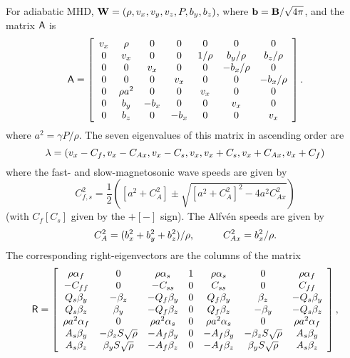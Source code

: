 For adiabatic MHD, ${\bf W} = (\rho, v_{x}, v_{y}, v_{z}, P, b_{y}, b_{z})$,
where ${\bf b} = {\bf B}/\sqrt{4\pi}$, and the matrix ${\sf A}$ is
\begin{equation}
{\sf A} = \left[ \begin{array}{cccccccc}
v_x & \rho & 0 & 0 & 0 & 0 & 0 \\
0 & v_x & 0 & 0 & 1/\rho & b_y/\rho & b_z/\rho \\
0 & 0 & v_x & 0 & 0 & -b_x/\rho & 0 \\
0 & 0 & 0 & v_x & 0 & 0 & -b_x/\rho \\
0 & \rho a^{2} & 0 & 0 & v_{x} & 0 & 0 \\
0 & b_y & -b_x & 0 & 0 & v_x & 0 \\
0 & b_z & 0 & -b_x & 0 & 0 & v_x  \end{array} \right] .
\end{equation}
where $a^{2} = \gamma P/\rho$.
The seven eigenvalues of this matrix in ascending order are
\begin{equation}
{\bf \lambda} = (v_{x}-C_{f}, v_{x}-C_{Ax}, v_{x}-C_{s}, v_{x},
v_{x}+C_{s}, v_{x}+C_{Ax}, v_{x}+C_{f})
\end{equation}
where the fast- and slow-magnetosonic wave speeds are given by
\begin{equation}
C_{f,s}^2 = \frac{1}{2} \left( \left[a^{2}+C_{A}^{2}\right] \pm
\sqrt{\left[a^{2}+C_{A}^{2}\right]^{2} - 4 a^2 C_{Ax}^2}\right)
\end{equation}
(with $C_{f}[C_{s}]$ given by the $+[-]$ sign).  The Alfv\'{e}n speeds are
given by
\begin{equation}
C_{A}^{2} = (b_{x}^{2}+b_{y}^{2 }+b_{z}^{2})/\rho, \hspace*{1cm}
C_{Ax}^{2} = b_{x}^{2}/\rho.
\end{equation}
The corresponding right-eigenvectors are the columns of the matrix
\begin{equation}
{\sf R}  = \left[ \begin{array}{ccccccc}
\rho\alpha_{f} & 0 & \rho\alpha_{s} & 1 & \rho\alpha_{s} & 0 & \rho\alpha_{f} \\
-C_{ff} & 0 & -C_{ss} & 0 & C_{ss} & 0 & C_{ff} \\
Q_{s}\beta_{y} & -\beta_{z} & -Q_{f}\beta_{y} & 0 & Q_{f}\beta_{y} & \beta_{z} & -Q_{s}\beta_{y} \\
Q_{s}\beta_{z} & \beta_{y} & -Q_{f}\beta_{z} & 0 & Q_{f}\beta_{z} & -\beta_{y} & -Q_{s}\beta_{z} \\
\rho a^{2}\alpha_{f} & 0 & \rho a^{2}\alpha_{s} & 0 & \rho a^{2}\alpha_{s} & 0 & \rho a^{2}\alpha_{f} \\
A_{s}\beta_{y} & -\beta_{z}S\sqrt{\rho} & -A_{f}\beta_{y} & 0 & -A_{f}\beta_{y} & -\beta_{z}S\sqrt{\rho} & A_{s}\beta_{y} \\
A_{s}\beta_{z} & \beta_{y}S\sqrt{\rho} & -A_{f}\beta_{z} & 0 & -A_{f}\beta_{z} & \beta_{y}S\sqrt{\rho} & A_{s}\beta_{z} \end{array} \right] ,
\end{equation}
